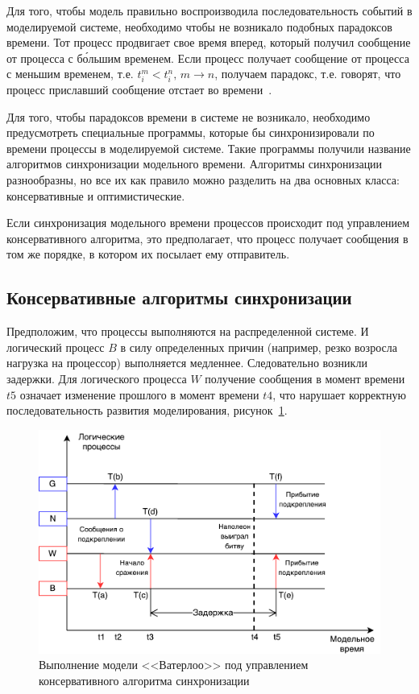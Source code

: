 Для того, чтобы модель правильно воспроизводила последовательность событий в моделируемой системе, необходимо чтобы не возникало подобных парадоксов времени.
Тот процесс продвигает свое время вперед, который получил сообщение от процесса с б\'ольшим временем. Если процесс получает сообщение от процесса с меньшим временем, т.е. $t_i^m<t_i^n, \, m \to n$, получаем парадокс, т.е. говорят, что процесс приславший сообщение  отстает во времени~\cite{okol}.

Для того, чтобы парадоксов времени в системе не возникало, необходимо предусмотреть специальные программы, которые бы синхронизировали по времени процессы в моделируемой системе. Такие программы получили название алгоритмов синхронизации модельного времени. Алгоритмы синхронизации разнообразны, но все их как правило можно разделить на два основных класса: консервативные и оптимистические.

Если синхронизация модельного времени процессов происходит под управлением консервативного алгоритма, это предполагает, что процесс получает сообщения в том же порядке, в котором их посылает ему отправитель.

\subsection{Консервативные алгоритмы синхронизации} \label{subsect1}

Предположим, что процессы выполняются на распределенной системе. И логический процесс $B$ в силу определенных причин (например, резко возросла нагрузка на процессор) выполняется медленнее. Следовательно возникли задержки. Для логического процесса $W$ получение сообщения в момент времени $t5$ означает изменение прошлого в момент времени $t4$, что нарушает корректную последовательность развития моделирования, рисунок~\ref{fig:Выполнение модели <<Ватерлоо>> под управлением консервативного алгоритма синхронизации}.

\begin{figure}[!ht]
\centering
\includegraphics[scale=1]{images/waterloo-kas.pdf}
\caption{Выполнение модели <<Ватерлоо>> под управлением консервативного алгоритма синхронизации}
\label{fig:Выполнение модели <<Ватерлоо>> под управлением консервативного алгоритма синхронизации}
\end{figure}

